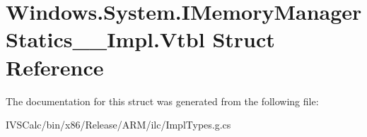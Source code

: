\hypertarget{struct_windows_1_1_system_1_1_i_memory_manager_statics_____impl_1_1_vtbl}{}\section{Windows.\+System.\+I\+Memory\+Manager\+Statics\+\_\+\+\_\+\+Impl.\+Vtbl Struct Reference}
\label{struct_windows_1_1_system_1_1_i_memory_manager_statics_____impl_1_1_vtbl}


The documentation for this struct was generated from the following file\+:\begin{DoxyCompactItemize}
\item 
I\+V\+S\+Calc/bin/x86/\+Release/\+A\+R\+M/ilc/Impl\+Types.\+g.\+cs\end{DoxyCompactItemize}

